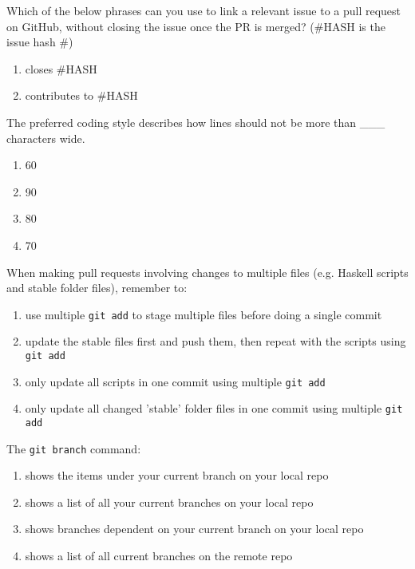 \documentclass[12pt,fleqn]{examtst}
\begin{document}

\newpage
\noindent
\begin{minipage}{\textwidth}

Which of the below phrases can you use to link a relevant issue to a pull request on GitHub, without closing the issue once the PR is merged? (\#HASH is the issue hash \#)

\begin{enumerate}
    \item closes \#HASH
    \item contributes to \#HASH \marker
\end{enumerate}

The preferred coding style describes how lines should not be more than \_\_\_ characters wide.

\begin{enumerate}
    \item 60
    \item 90
    \item 80 \marker
    \item 70
\end{enumerate}

When making pull requests involving changes to multiple files (e.g. Haskell scripts and stable folder files), remember to:

\begin{enumerate}
    \item use multiple \lstinline{git add} to stage multiple files before doing a single commit \marker
    \item update the stable files first and push them, then repeat with the scripts using \lstinline{git add}
    \item only update all scripts in one commit using multiple \lstinline{git add}
    \item only update all changed 'stable' folder files in one commit using multiple \lstinline{git add}
\end{enumerate}

The \lstinline{git branch} command:

\begin{enumerate}
    \item shows the items under your current branch on your local repo
    \item shows a list of all your current branches on your local repo \marker
    \item shows branches dependent on your current branch on your local repo
    \item shows a list of all current branches on the remote repo
\end{enumerate}

\end{minipage}
\end{document}
